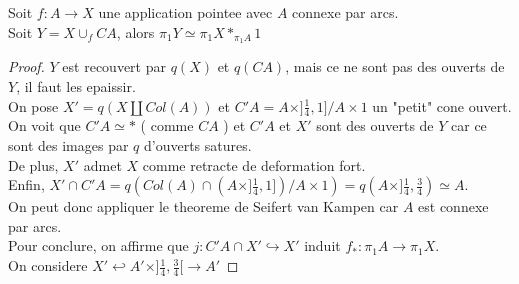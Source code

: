\documentclass[../main.tex]{subfiles}
\begin{document}
\begin{propo}
Soit $f: A\to X$ une application pointee avec $A$ connexe par arcs.\\
Soit $Y= X\cup_f CA$, alors $\pi_1 Y \simeq \pi_1X \ast_{\pi_1 A} 1$ 
\end{propo}
\begin{proof}
$Y$ est recouvert par $q( X) $ et $q( CA) $, mais ce ne sont pas des ouverts de $Y$, il faut les epaissir.\\
On pose $X' = q\left(  X \coprod Col( A) \right) $ et $C'A = A \times ] \frac{1}{4},1 ] / A\times 1$ un "petit" cone ouvert.\\
On voit que $C' A \simeq \ast$ ( comme $CA$ ) et $ C'A$ et $X'$ sont  des ouverts de $Y$ car ce sont des images par $q$ d'ouverts satures.\\
De plus, $X'$ admet $X$ comme retracte de deformation fort.\\
Enfin, $X'\cap C' A = q\left( Col( A) \cap ( A \times ] \frac{1}{4},1])/ A\times 1\right) = q\left( A\times ] \frac{1}{4}, \frac{3}{4}\right) \simeq A $.\\
On peut donc appliquer le theoreme de Seifert van Kampen car $A$ est connexe par arcs.\\
Pour conclure, on affirme que $ j: C'A \cap X' \hookrightarrow X'$ induit $f_\ast: \pi_1 A \to \pi_1X$.\\
On considere  $ X' \hookleftarrow A' \times ]\frac{1}{4}, \frac{3}{4}[ \to A'$ 
\end{proof}
\end{document}

